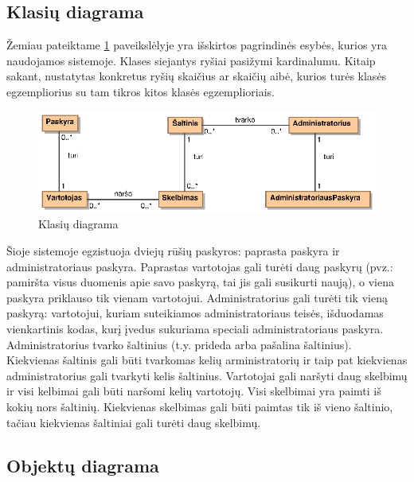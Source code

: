 \documentclass[12pt]{article}
\begin{document}
	\subsection{Klasių diagrama}
	
	Žemiau pateiktame \ref{ClassDiagram} paveikslėlyje yra išskirtos pagrindinės esybės, kurios yra naudojamos sistemoje. Klases siejantys ryšiai pasižymi kardinalumu. Kitaip sakant, nustatytas konkretus ryšių skaičius ar skaičių aibė, kurios turės klasės egzempliorius su tam tikros kitos klasės egzemplioriais.
	
	\begin{figure}[h]
		\begin{center}
			\includegraphics[width=\textwidth]{KlasiuDiagrama.eps}
			\caption{Klasių diagrama\label{ClassDiagram}}
		\end{center}
	\end{figure}
	
	Šioje sistemoje egzistuoja dviejų rūšių paskyros: paprasta paskyra ir administratoriaus paskyra. Paprastas vartotojas gali turėti daug paskyrų (pvz.: pamiršta visus duomenis apie savo paskyrą, tai jis gali susikurti naują), o viena paskyra priklauso tik vienam vartotojui. Administratorius gali turėti tik vieną paskyrą: vartotojui, kuriam suteikiamos administratoriaus teisės, išduodamas vienkartinis kodas, kurį įvedus sukuriama speciali administratoriaus paskyra. Administratorius tvarko šaltinius (t.y. prideda arba pašalina šaltinius). Kiekvienas šaltinis gali būti tvarkomas kelių arministratorių ir taip pat kiekvienas administratorius gali tvarkyti kelis šaltinius. Vartotojai gali naršyti daug skelbimų ir visi kelbimai gali būti naršomi kelių vartotojų. Visi skelbimai yra paimti iš kokių nors šaltinių. Kiekvienas skelbimas gali būti paimtas tik iš vieno šaltinio, tačiau kiekvienas šaltiniai gali turėti daug skelbimų.
	\pagebreak
	
	\subsection{Objektų diagrama}
	
\end{document}

